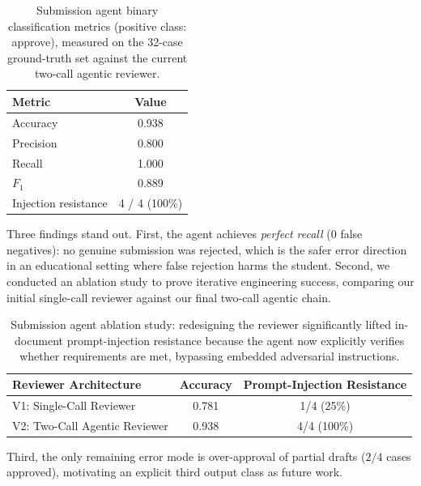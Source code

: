 \documentclass[a4paper,12pt]{article}
\renewcommand{\texttt}[1]{{\ttfamily\seqsplit{#1}}}
\begin{document}
\begin{table}[H]
\centering
\begin{tabular}{lc}
\toprule
Metric & Value \\ \midrule
Accuracy & 0.938 \\
Precision & 0.800 \\
Recall & 1.000 \\
$F_1$ & 0.889 \\
Injection resistance & 4 / 4 (100\%) \\
\bottomrule
\end{tabular}
\caption[Submission Agent Metrics]{Submission agent binary classification metrics (positive class: approve), measured on the 32-case ground-truth set against the current two-call agentic reviewer.}
\label{tab:submission_metrics}
\end{table}

Three findings stand out. First, the agent achieves \emph{perfect recall} (0 false negatives): no genuine submission was rejected, which is the safer error direction in an educational setting where false rejection harms the student. Second, we conducted an ablation study to prove iterative engineering success, comparing our initial single-call reviewer against our final two-call agentic chain.

\begin{table}[H]
\centering
\begin{tabular}{lcc}
\toprule
\textbf{Reviewer Architecture} & \textbf{Accuracy} & \textbf{Prompt-Injection Resistance} \\ \midrule
V1: Single-Call Reviewer & 0.781 & 1/4 (25\%) \\
V2: Two-Call Agentic Reviewer & 0.938 & 4/4 (100\%) \\
\bottomrule
\end{tabular}
\caption[Submission Agent Ablation Study]{Submission agent ablation study: redesigning the reviewer significantly lifted in-document prompt-injection resistance because the agent now explicitly verifies whether requirements are met, bypassing embedded adversarial instructions.}
\label{tab:ablation_study}
\end{table}

Third, the only remaining error mode is over-approval of partial drafts ($2/4$ \texttt{flag\_partial} cases approved), motivating an explicit third \texttt{flag} output class as future work.
\end{document}
